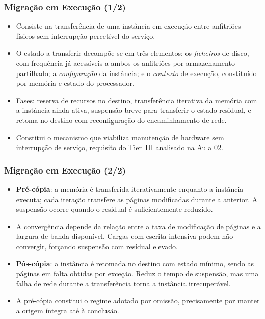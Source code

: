 \documentclass[aspectratio=169]{beamer}
\begin{document}
\begin{frame}
\frametitle{Migração em Execução \textcolor{NudeTaupe}{\small(1/2)}}
\begin{itemize}
    \setlength\itemsep{0.35cm}
    \item Consiste na transferência de uma instância em execução entre anfitriões físicos sem interrupção percetível do serviço.
    \item O estado a transferir decompõe-se em três elementos: os \emph{ficheiros} de disco, com frequência já acessíveis a ambos os anfitriões por armazenamento partilhado; a \emph{configuração} da instância; e o \emph{contexto} de execução, constituído por memória e estado do processador.
    \item Fases: reserva de recursos no destino, transferência iterativa da memória com a instância ainda ativa, suspensão breve para transferir o estado residual, e retoma no destino com reconfiguração do encaminhamento de rede.
    \item Constitui o mecanismo que viabiliza manutenção de hardware sem interrupção de serviço, requisito do Tier~III analisado na Aula 02.
\end{itemize}
\end{frame}

\begin{frame}
\frametitle{Migração em Execução \textcolor{NudeTaupe}{\small(2/2)}}
\begin{itemize}
    \setlength\itemsep{0.35cm}
    \item \textbf{Pré-cópia}: a memória é transferida iterativamente enquanto a instância executa; cada iteração transfere as páginas modificadas durante a anterior. A suspensão ocorre quando o residual é suficientemente reduzido.
    \item A convergência depende da relação entre a taxa de modificação de páginas e a largura de banda disponível. Cargas com escrita intensiva podem não convergir, forçando suspensão com residual elevado.
    \item \textbf{Pós-cópia}: a instância é retomada no destino com estado mínimo, sendo as páginas em falta obtidas por exceção. Reduz o tempo de suspensão, mas uma falha de rede durante a transferência torna a instância irrecuperável.
    \item A pré-cópia constitui o regime adotado por omissão, precisamente por manter a origem íntegra até à conclusão.
\end{itemize}
\end{frame}
\end{document}
